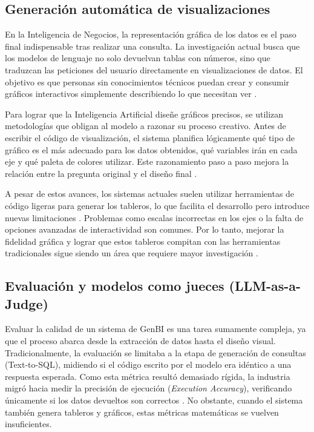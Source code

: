 \subsection{Generación automática de visualizaciones}

En la Inteligencia de Negocios, la representación gráfica de los datos es el
paso final indispensable tras realizar una consulta. La investigación actual
busca que los modelos de lenguaje no solo devuelvan tablas con números, sino
que traduzcan las peticiones del usuario directamente en visualizaciones de
datos. El objetivo es que personas sin conocimientos técnicos puedan crear y
consumir gráficos interactivos simplemente describiendo lo que necesitan ver
\citep{perez2026ia}.

Para lograr que la Inteligencia Artificial diseñe gráficos precisos, se utilizan
metodologías que obligan al modelo a razonar su proceso creativo. Antes de
escribir el código de visualización, el sistema planifica lógicamente qué tipo
de gráfico es el más adecuado para los datos obtenidos, qué variables irán en
cada eje y qué paleta de colores utilizar. Este razonamiento paso a paso mejora
la relación entre la pregunta original y el diseño final
\citep{shuai2025deepvis}.

A pesar de estos avances, los sistemas actuales suelen utilizar herramientas de
código ligeras para generar los tableros, lo que facilita el desarrollo pero
introduce nuevas limitaciones
\citep{shi2026nl2dashboardlightweightcontrollableframework}. Problemas como
escalas incorrectas en los ejes o la falta de opciones avanzadas de
interactividad son comunes. Por lo tanto, mejorar la fidelidad gráfica y lograr
que estos tableros compitan con las herramientas tradicionales sigue siendo un
área que requiere mayor investigación \citep{perez2026ia}.

\subsection{Evaluación y modelos como jueces (LLM-as-a-Judge)}

Evaluar la calidad de un sistema de GenBI
es una tarea sumamente compleja, ya que el proceso abarca desde la extracción de
datos hasta el diseño visual. Tradicionalmente, la evaluación se limitaba a la
etapa de generación de consultas (Text-to-SQL), midiendo si el código escrito
por el modelo era idéntico a una respuesta esperada. Como esta métrica resultó
demasiado rígida, la industria migró hacia medir la precisión de ejecución
(\textit{Execution Accuracy}), verificando únicamente si los datos devueltos
son correctos \citep{lei2024spider}. No obstante, cuando el sistema también
genera tableros y gráficos, estas métricas matemáticas se vuelven insuficientes.

